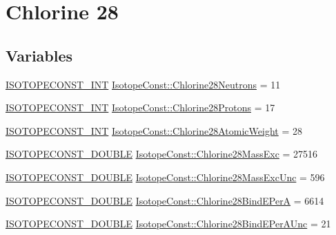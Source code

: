 \hypertarget{group___isotope_const-_chlorine-_cl28}{}\section{Chlorine 28}
\label{group___isotope_const-_chlorine-_cl28}
\subsection*{Variables}
\begin{DoxyCompactItemize}
\item 
\mbox{\hyperlink{group___isotope_const-_macros_ga5f18360b3e99483a35c32d789e62621c}{I\+S\+O\+T\+O\+P\+E\+C\+O\+N\+S\+T\+\_\+\+I\+NT}} \mbox{\hyperlink{group___isotope_const-_chlorine-_cl28_gada80c2703ec9fc363c54215670745b89}{Isotope\+Const\+::\+Chlorine28\+Neutrons}} = 11
\item 
\mbox{\hyperlink{group___isotope_const-_macros_ga5f18360b3e99483a35c32d789e62621c}{I\+S\+O\+T\+O\+P\+E\+C\+O\+N\+S\+T\+\_\+\+I\+NT}} \mbox{\hyperlink{group___isotope_const-_chlorine-_cl28_gaabaa3b01c821849d011c8598b7d8e89f}{Isotope\+Const\+::\+Chlorine28\+Protons}} = 17
\item 
\mbox{\hyperlink{group___isotope_const-_macros_ga5f18360b3e99483a35c32d789e62621c}{I\+S\+O\+T\+O\+P\+E\+C\+O\+N\+S\+T\+\_\+\+I\+NT}} \mbox{\hyperlink{group___isotope_const-_chlorine-_cl28_gad6ef2805588356089993b95c1b5b4e06}{Isotope\+Const\+::\+Chlorine28\+Atomic\+Weight}} = 28
\item 
\mbox{\hyperlink{group___isotope_const-_macros_ga8f45a7272ce02c0b4c65c44636ed719a}{I\+S\+O\+T\+O\+P\+E\+C\+O\+N\+S\+T\+\_\+\+D\+O\+U\+B\+LE}} \mbox{\hyperlink{group___isotope_const-_chlorine-_cl28_ga8b29e66a5eacaa6d7d0f491bad86bafd}{Isotope\+Const\+::\+Chlorine28\+Mass\+Exc}} = 27516
\item 
\mbox{\hyperlink{group___isotope_const-_macros_ga8f45a7272ce02c0b4c65c44636ed719a}{I\+S\+O\+T\+O\+P\+E\+C\+O\+N\+S\+T\+\_\+\+D\+O\+U\+B\+LE}} \mbox{\hyperlink{group___isotope_const-_chlorine-_cl28_gab68743feccea714c55943d023df556cc}{Isotope\+Const\+::\+Chlorine28\+Mass\+Exc\+Unc}} = 596
\item 
\mbox{\hyperlink{group___isotope_const-_macros_ga8f45a7272ce02c0b4c65c44636ed719a}{I\+S\+O\+T\+O\+P\+E\+C\+O\+N\+S\+T\+\_\+\+D\+O\+U\+B\+LE}} \mbox{\hyperlink{group___isotope_const-_chlorine-_cl28_ga6769c7ea5d4479fb1ffd07b1c6efb4d1}{Isotope\+Const\+::\+Chlorine28\+Bind\+E\+PerA}} = 6614
\item 
\mbox{\hyperlink{group___isotope_const-_macros_ga8f45a7272ce02c0b4c65c44636ed719a}{I\+S\+O\+T\+O\+P\+E\+C\+O\+N\+S\+T\+\_\+\+D\+O\+U\+B\+LE}} \mbox{\hyperlink{group___isotope_const-_chlorine-_cl28_gaa318b92f52db30af72dbf0688595949e}{Isotope\+Const\+::\+Chlorine28\+Bind\+E\+Per\+A\+Unc}} = 21

\end{DoxyCompactItemize}

